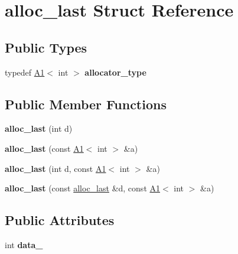 \hypertarget{structalloc__last}{}\section{alloc\+\_\+last Struct Reference}
\label{structalloc__last}
\subsection*{Public Types}
\begin{DoxyCompactItemize}
\item 
\mbox{\label{structalloc__last_a9700ce5098a74eb897c0e257db47624a}} 
typedef \mbox{\hyperlink{struct_a1}{A1}}$<$ int $>$ {\bfseries allocator\+\_\+type}
\end{DoxyCompactItemize}
\subsection*{Public Member Functions}
\begin{DoxyCompactItemize}
\item 
\mbox{\label{structalloc__last_aa034c490b71c628a5b621f109d129b9a}} 
{\bfseries alloc\+\_\+last} (int d)
\item 
\mbox{\label{structalloc__last_a5fbad3bca6fbce0e4bd1662d15524c6c}} 
{\bfseries alloc\+\_\+last} (const \mbox{\hyperlink{struct_a1}{A1}}$<$ int $>$ \&a)
\item 
\mbox{\label{structalloc__last_ab5a344955f501cc424eb372beb86e337}} 
{\bfseries alloc\+\_\+last} (int d, const \mbox{\hyperlink{struct_a1}{A1}}$<$ int $>$ \&a)
\item 
\mbox{\label{structalloc__last_abb42a7d33c473805780c85b70972e2b8}} 
{\bfseries alloc\+\_\+last} (const \mbox{\hyperlink{structalloc__last}{alloc\+\_\+last}} \&d, const \mbox{\hyperlink{struct_a1}{A1}}$<$ int $>$ \&a)
\end{DoxyCompactItemize}
\subsection*{Public Attributes}
\begin{DoxyCompactItemize}
\item 
\mbox{\label{structalloc__last_ae1bdf2ba9fb2c6473d0d8ae99fed384c}} 
int {\bfseries data\+\_\+}
\end{DoxyCompactItemize}
